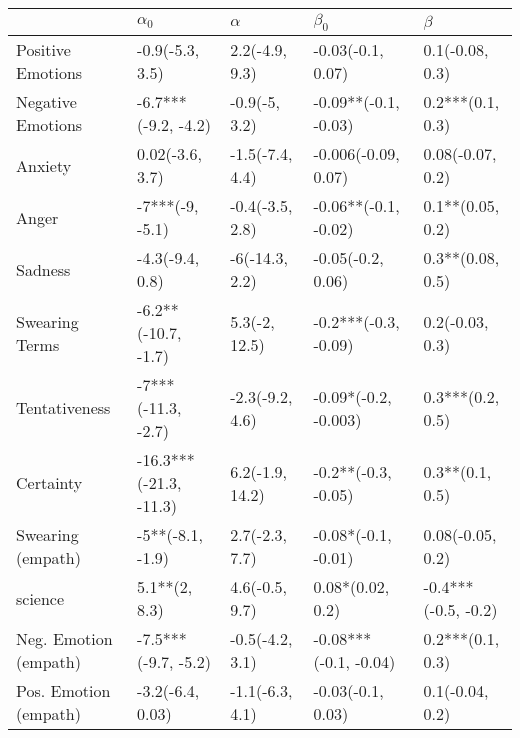 \begin{tabular}{lllll}
\toprule
{} &              $\alpha_0$ &         $\alpha$ &              $\beta_0$ &              $\beta$ \\
\midrule
Positive Emotions     &         -0.9(-5.3, 3.5) &   2.2(-4.9, 9.3) &      -0.03(-0.1, 0.07) &      0.1(-0.08, 0.3) \\
Negative Emotions     &     -6.7***(-9.2, -4.2) &    -0.9(-5, 3.2) &   -0.09**(-0.1, -0.03) &     0.2***(0.1, 0.3) \\
Anxiety               &         0.02(-3.6, 3.7) &  -1.5(-7.4, 4.4) &    -0.006(-0.09, 0.07) &     0.08(-0.07, 0.2) \\
Anger                 &         -7***(-9, -5.1) &  -0.4(-3.5, 2.8) &   -0.06**(-0.1, -0.02) &     0.1**(0.05, 0.2) \\
Sadness               &         -4.3(-9.4, 0.8) &   -6(-14.3, 2.2) &      -0.05(-0.2, 0.06) &     0.3**(0.08, 0.5) \\
Swearing Terms        &     -6.2**(-10.7, -1.7) &    5.3(-2, 12.5) &   -0.2***(-0.3, -0.09) &      0.2(-0.03, 0.3) \\
Tentativeness         &      -7***(-11.3, -2.7) &  -2.3(-9.2, 4.6) &   -0.09*(-0.2, -0.003) &     0.3***(0.2, 0.5) \\
Certainty             &  -16.3***(-21.3, -11.3) &  6.2(-1.9, 14.2) &    -0.2**(-0.3, -0.05) &      0.3**(0.1, 0.5) \\
Swearing (empath)     &        -5**(-8.1, -1.9) &   2.7(-2.3, 7.7) &    -0.08*(-0.1, -0.01) &     0.08(-0.05, 0.2) \\
science               &           5.1**(2, 8.3) &   4.6(-0.5, 9.7) &       0.08*(0.02, 0.2) &  -0.4***(-0.5, -0.2) \\
Neg. Emotion (empath) &     -7.5***(-9.7, -5.2) &  -0.5(-4.2, 3.1) &  -0.08***(-0.1, -0.04) &     0.2***(0.1, 0.3) \\
Pos. Emotion (empath) &        -3.2(-6.4, 0.03) &  -1.1(-6.3, 4.1) &      -0.03(-0.1, 0.03) &      0.1(-0.04, 0.2) \\
\bottomrule
\end{tabular}
